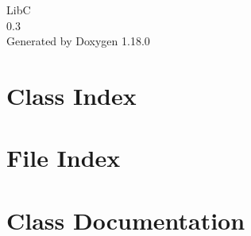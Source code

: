 \documentclass[twoside]{book}
\newcommand{\+}{\discretionary{\mbox{\scriptsize$\hookleftarrow$}}{}{}}
\newcommand{\clearemptydoublepage}{%
    \newpage{\pagestyle{empty}\cleardoublepage}%
  }
\begin{document}
  \raggedbottom
    \hypersetup{pageanchor=false,
                bookmarksnumbered=true,
                pdfencoding=unicode
               }
  \begin{titlepage}
  \vspace*{7cm}
  \begin{center}%
  {\Large LibC}\\
  [1ex]\large 0.\+3 \\
  \vspace*{1cm}
  {\large Generated by Doxygen 1.18.0}\\
  \end{center}
  \end{titlepage}
  \clearemptydoublepage
  \tableofcontents
  \clearemptydoublepage
  \hypersetup{pageanchor=true}

\chapter{Class Index}

\chapter{File Index}

\chapter{Class Documentation}


















\end{document}
